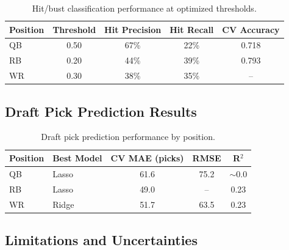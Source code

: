 \documentclass[11pt]{article}
\begin{document}

\begin{table}[H]
  \centering
  \begin{tabular}{lcccc}
    \toprule
    Position & Threshold & Hit Precision & Hit Recall & CV Accuracy \\
    \midrule
    QB & 0.50 & 67\% & 22\% & 0.718 \\
    RB & 0.20 & 44\% & 39\% & 0.793 \\
    WR & 0.30 & 38\% & 35\% & -- \\
    \bottomrule
  \end{tabular}
  \caption{Hit/bust classification performance at optimized thresholds.}
  \label{tab:classification}
\end{table}

\subsection{Draft Pick Prediction Results}


\begin{table}[H]
  \centering
  \begin{tabular}{llccc}
    \toprule
    Position & Best Model & CV MAE (picks) & RMSE & R$^2$ \\
    \midrule
    QB & Lasso & 61.6 & 75.2 & $\sim$0.0 \\
    RB & Lasso & 49.0 & -- & 0.23 \\
    WR & Ridge & 51.7 & 63.5 & 0.23 \\
    \bottomrule
  \end{tabular}
  \caption{Draft pick prediction performance by position.}
  \label{tab:draft_prediction}
\end{table}

\subsection{Limitations and Uncertainties}

\end{document}
